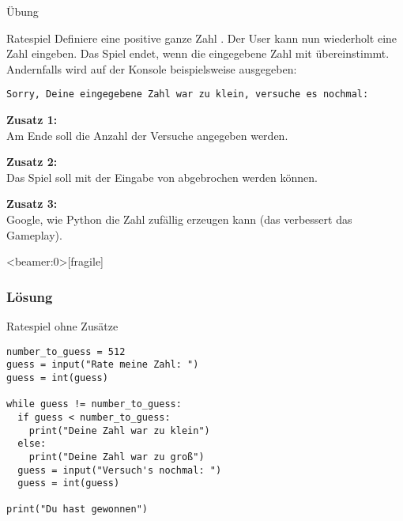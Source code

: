 %
%
%
%	
%

\begin{frame}{Übung}

\begin{block}{Ratespiel}
\vspace{2pt}
Definiere eine positive ganze Zahl . Der User kann nun wiederholt eine Zahl eingeben. Das Spiel endet, wenn die eingegebene Zahl mit  übereinstimmt. 
Andernfalls wird auf der Konsole beispielsweise ausgegeben: 

\texttt{Sorry, Deine eingegebene Zahl war zu klein, versuche es nochmal: }

\pause
\textbf{Zusatz 1:} \\
Am Ende soll die Anzahl der Versuche angegeben werden.

\pause
\textbf{Zusatz 2:} \\
Das Spiel soll mit der Eingabe von  abgebrochen werden können. 

\pause
\textbf{Zusatz 3:} \\
Google, wie Python die Zahl  zufällig erzeugen kann (das verbessert das Gameplay).  

\end{block}
\end{frame}



\begin{frame}<beamer:0>[fragile]
\frametitle{Lösung}
\begin{solutionblock}{Ratespiel ohne Zusätze}
\begin{verbatim}
number_to_guess = 512
guess = input("Rate meine Zahl: ")
guess = int(guess)

while guess != number_to_guess:
  if guess < number_to_guess:
    print("Deine Zahl war zu klein")
  else:
    print("Deine Zahl war zu groß")
  guess = input("Versuch's nochmal: ")
  guess = int(guess)

print("Du hast gewonnen")
\end{verbatim}
\end{solutionblock}
\end{frame}


